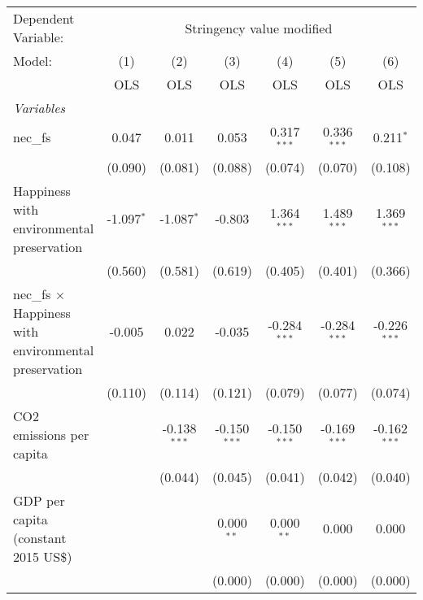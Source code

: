 
\begingroup
\centering
\begin{tabular}{lcccccc}
   \toprule
   Dependent Variable: & \multicolumn{6}{c}{Stringency value modified}\\
   Model:                                                       & (1)          & (2)            & (3)            & (4)            & (5)            & (6)\\  
                                                                &  OLS         & OLS            & OLS            & OLS            & OLS            & OLS\\  
   \midrule
   \emph{Variables}\\
   nec\_fs                                                      & 0.047        & 0.011          & 0.053          & 0.317$^{***}$  & 0.336$^{***}$  & 0.211$^{*}$\\   
                                                                & (0.090)      & (0.081)        & (0.088)        & (0.074)        & (0.070)        & (0.108)\\   
   Happiness with environmental preservation                    & -1.097$^{*}$ & -1.087$^{*}$   & -0.803         & 1.364$^{***}$  & 1.489$^{***}$  & 1.369$^{***}$\\   
                                                                & (0.560)      & (0.581)        & (0.619)        & (0.405)        & (0.401)        & (0.366)\\   
   nec\_fs $\times$ Happiness with environmental preservation   & -0.005       & 0.022          & -0.035         & -0.284$^{***}$ & -0.284$^{***}$ & -0.226$^{***}$\\   
                                                                & (0.110)      & (0.114)        & (0.121)        & (0.079)        & (0.077)        & (0.074)\\   
   CO2 emissions per capita                                     &              & -0.138$^{***}$ & -0.150$^{***}$ & -0.150$^{***}$ & -0.169$^{***}$ & -0.162$^{***}$\\   
                                                                &              & (0.044)        & (0.045)        & (0.041)        & (0.042)        & (0.040)\\   
   GDP per capita (constant 2015 US\$)                          &              &                & 0.000$^{**}$   & 0.000$^{**}$   & 0.000          & 0.000\\   
                                                                &              &                & (0.000)        & (0.000)        & (0.000)        & (0.000)\\   

\end{tabular}
